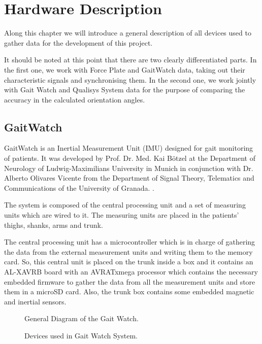 \chapter{Hardware Description}
\label{ch:Hardware}
Along this chapter we will introduce a general description of all devices used to gather data for the development of this project.


It should be noted at this point that there are two clearly differentiated parts. In the first one, we work with Force Plate and GaitWatch data, taking out their characteristic signals and synchronising them. In the second one, we work jointly with Gait Watch and Qualisys System data for the purpose of comparing the accuracy in the calculated orientation angles.


\section{GaitWatch}

GaitWatch is an Inertial Measurement Unit (IMU) designed for gait monitoring of patients. It was developed by Prof. Dr. Med. Kai Bötzel at the Department of Neurology of Ludwig-Maximilians University in Munich in conjunction with Dr. Alberto Olivares Vicente from the Department of Signal Theory, Telematics and Communications of the University of Granada. \cite{OlivaresBotzel2013}.

The system is composed of the central processing unit and a set of measuring units which are wired to it. The measuring units are placed in the patients’ thighs, shanks, arms and trunk.

The central processing unit has a microcontroller which is in charge of gathering the data from the external measurement units and writing them to the memory card. So, this central unit is placed on the trunk inside a box and it contains an AL-XAVRB board with an AVRATxmega processor which contains the necessary embedded firmware to gather the data from all the measurement units and store them in a microSD card. Also, the trunk box contains some embedded magnetic and inertial sensors.

\begin{figure}[H]
	\centering
	\caption{General Diagram of the Gait Watch.}
	\label{fig:diagram}
\end{figure}

\begin{figure}[H]
	\centering
	\caption{Devices used in Gait Watch System.}
	\label{fig:devicesGW}
\end{figure}

